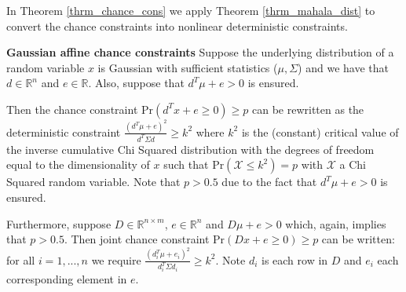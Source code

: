 In Theorem \ref{thrm_chance_cons} we apply Theorem \ref{thrm_mahala_dist} to convert the chance constraints into nonlinear deterministic constraints.
\begin{thrm}
\textbf{Gaussian affine chance constraints} Suppose the underlying distribution of a random variable $x$ is Gaussian with sufficient statistics ($\mu, \Sigma$) and we have that $d \in \mathbb{R}^{n}$ and $e \in \mathbb{R}$. Also, suppose that $d^T\mu+e>0$ is ensured.

Then the chance constraint $\text{Pr}(d^Tx + e \geq 0) \geq p$ can be rewritten as the deterministic constraint $\frac{(d^T\mu+e)^2}{d^T \Sigma d} \geq k^2$ where $k^2$ is the (constant) critical value of the inverse cumulative Chi Squared distribution with the degrees of freedom equal to the dimensionality of $x$ such that $\text{Pr}(\mathcal{X} \leq k^2) = p$ with $\mathcal{X}$ a Chi Squared random variable. Note that $p > 0.5$ due to the fact that $d^T\mu+e>0$ is ensured.

Furthermore, suppose $D \in \mathbb{R}^{n\times m}$, $e \in \mathbb{R}^n$ and $D\mu + e >0$ which, again, implies that $p > 0.5$. Then joint chance constraint $\text{Pr}(Dx + e \geq 0) \geq p$ can be written: for all $i=1,...,n$ we require $\frac{(d^T_i\mu+e_i)^2}{d_i^T \Sigma d_i} \geq k^2$. Note $d_i$ is each row in $D$ and $e_i$ each corresponding element in $e$.
\label{thrm_chance_cons}
\end{thrm}
